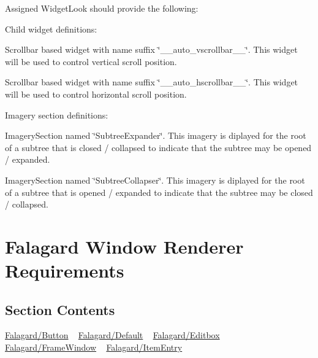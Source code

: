 Assigned Widget\+Look should provide the following\+: 
\begin{DoxyItemize}
\item Child widget definitions\+: 
\begin{DoxyItemize}
\item Scrollbar based widget with name suffix \char`\"{}\+\_\+\+\_\+auto\+\_\+vscrollbar\+\_\+\+\_\+\char`\"{}. This widget will be used to control vertical scroll position. 
\item Scrollbar based widget with name suffix \char`\"{}\+\_\+\+\_\+auto\+\_\+hscrollbar\+\_\+\+\_\+\char`\"{}. This widget will be used to control horizontal scroll position. 
\end{DoxyItemize}


\item Imagery section definitions\+: 
\begin{DoxyItemize}
\item Imagery\+Section named \char`\"{}\+Subtree\+Expander\char`\"{}. This imagery is diplayed for the root of a subtree that is closed / collapsed to indicate that the subtree may be opened / expanded. 
\item Imagery\+Section named \char`\"{}\+Subtree\+Collapser\char`\"{}. This imagery is diplayed for the root of a subtree that is opened / expanded to indicate that the subtree may be closed / collapsed. 
\end{DoxyItemize}
\end{DoxyItemize}\hypertarget{fal_wr_ref}{}\section{Falagard Window Renderer Requirements}\label{fal_wr_ref}
\hypertarget{fal_wr_ref_fal_wr_ref_sec_0}{}\subsection{Section Contents}\label{fal_wr_ref_fal_wr_ref_sec_0}
\mbox{\hyperlink{fal_wr_ref_fal_wr_ref_sec_1}{Falagard/\+Button}} ~\newline
 \mbox{\hyperlink{fal_wr_ref_fal_wr_ref_sec_2}{Falagard/\+Default}} ~\newline
 \mbox{\hyperlink{fal_wr_ref_fal_wr_ref_sec_3}{Falagard/\+Editbox}} ~\newline
 \mbox{\hyperlink{fal_wr_ref_fal_wr_ref_sec_4}{Falagard/\+Frame\+Window}} ~\newline
 \mbox{\hyperlink{fal_wr_ref_fal_wr_ref_sec_5}{Falagard/\+Item\+Entry}} ~\newline

